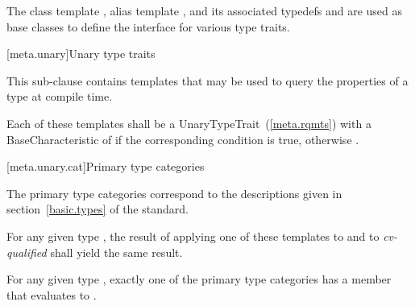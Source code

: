 \pnum
The class template ,
alias template , and
its associated typedefs  and 
are used as base classes to define
the interface for various type traits.

[meta.unary]{Unary type traits}

\pnum
This sub-clause contains templates that may be used to query the
properties of a type at compile time.

\pnum
Each of these templates shall be a
UnaryTypeTrait~(\ref{meta.rqmts})
with a BaseCharacteristic of
 if the corresponding condition is true, otherwise
.

[meta.unary.cat]{Primary type categories}

\pnum
The primary type categories correspond to the descriptions given in
section~\ref{basic.types} of the \Cpp standard.

\pnum
For any given type , the result of applying one of these templates to
 and to \textit{cv-qualified}  shall yield the same result.

\pnum
\enternote
For any given type , exactly one of the primary type categories
has a  member that evaluates to .
\exitnote

